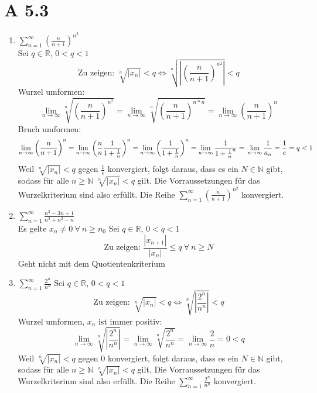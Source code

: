 \documentclass{article}
\begin{document}
    \section*{A 5.3}
    \begin{enumerate}[ label= (\roman*) ]
        \item \( \sum_{n=1}^{\infty} {\left( \frac{n}{n+1} \right)}^{n^2} \) \\
        Sei \(q \in \mathbb{R}\), \(0 < q < 1\) \\
        \[ \text{Zu zeigen: } \sqrt[n]{|x_n|} < q \Leftrightarrow \sqrt[n]{ \left| {\left( \frac{n}{n+1} \right)}^{n^2} \right| } < q \]
        Wurzel umformen:
        \[ 
            \lim_{n \to \infty} \sqrt[n]{ {\left( \frac{n}{n+1} \right)}^{n^2} } =
            \lim_{n \to \infty} \sqrt[n]{ {\left( \frac{n}{n+1} \right)}^{n * n} } = 
            \lim_{n \to \infty} {\left( \frac{n}{n+1} \right)}^{n}
        \]
        Bruch umformen:
        \[
            \lim_{n \to \infty} {\left( \frac{n}{n+1} \right)}^{n} =
            \lim_{n \to \infty} {\left( \frac{n}{n} \frac{1}{1+ \frac{1}{n}} \right)}^{n} =
            \lim_{n \to \infty} {\left( \frac{1}{1+ \frac{1}{n}} \right)}^{n} = 
            \lim_{n \to \infty} \frac{1}{ { 1 + \frac{1}{n} }^{n} } = \\
            \lim_{n \to \infty} \frac{1}{ a_n } =
            \frac{1}{e} = q < 1
        \]
        Weil \(\sqrt[n]{|x_n|} < q\) gegen \(\frac{1}{e}\) konvergiert,
        folgt daraus, dass es ein \(N \in \mathbb{N}\) gibt, sodass für alle \(n \geq \mathbb{N} \) \(\sqrt[n]{|x_n|} < q\) gilt.
        Die Vorraussetzungen für das Wurzelkriterium sind also erfüllt.
        Die Reihe \( \sum_{n=1}^{\infty} {\left( \frac{n}{n+1} \right)}^{n^2} \) konvergiert.

        \item \( \sum_{n=1}^{\infty} \frac{ n^2 -3n + 1 }{ n^3 + n^2 - n} \) \\
        Es gelte \( x_n \neq 0 \ \forall \: n \geq n_0 \)
        Sei \(q \in \mathbb{R}\), \(0 < q < 1\) \\

        \[ \text{Zu zeigen: }  \frac{|x_{n+1}|}{|x_n|} \leq q \ \forall \: n \geq N \]
        Geht nicht mit dem Quotientenkriterium

        \item \(\sum_{n=1}^{\infty} \frac{2^n}{n^n}\)
        Sei \(q \in \mathbb{R}\), \(0 < q < 1\) \\
        \[ \text{Zu zeigen: } \sqrt[n]{|x_n|} < q \Leftrightarrow \sqrt[n]{ \left| \frac{2^n}{n^n} \right| } < q \]
        Wurzel umformen, \(x_n\) ist immer positiv:
        \[
            \lim_{n \to \infty} \sqrt[n]{ \left| \frac{2^n}{n^n} \right| } 
            = \lim_{n \to \infty} \sqrt[n]{ \frac{2^n}{n^n} } 
            = \lim_{n \to \infty} \frac{2}{n} = 0 < q
        \]
        Weil \(\sqrt[n]{|x_n|} < q\) gegen \(0\) konvergiert,
        folgt daraus, dass es ein \(N \in \mathbb{N}\) gibt, sodass für alle \(n \geq \mathbb{N} \) \(\sqrt[n]{|x_n|} < q\) gilt.
        Die Vorraussetzungen für das Wurzelkriterium sind also erfüllt.
        Die Reihe \( \sum_{n=1}^{\infty} \frac{2^n}{n^n} \) konvergiert.


\end{enumerate}
\end{document}
